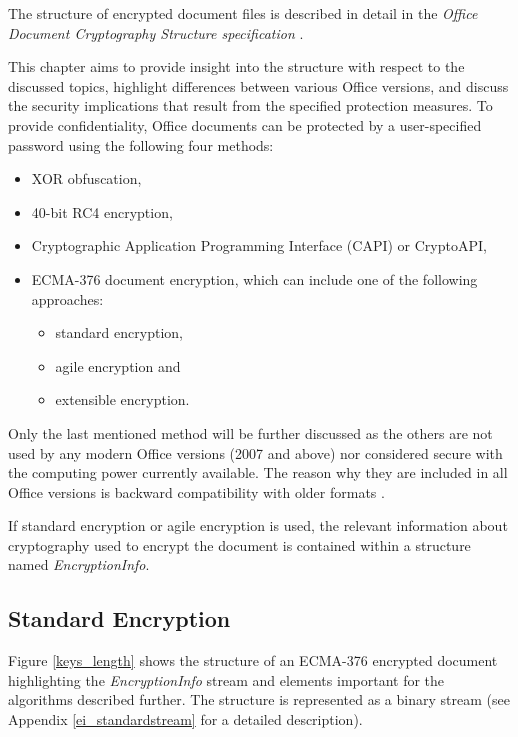 \documentclass[11pt,oneside]{fithesis2}
\begin{document}
The structure of encrypted document files is described in detail in the \textit{Office Document Cryptography Structure specification} \cite{msoffcrypto}.

This chapter aims to provide insight into the structure with respect to the discussed topics, highlight differences between various Office versions, and discuss the security implications that result from the specified protection measures.
To provide confidentiality, Office documents can be protected by a user-specified password using the following four methods:
\begin{itemize}
\setlength\itemsep{0.1em}
\item{XOR obfuscation,}
\item{40-bit RC4 encryption,}
\item{Cryptographic Application Programming Interface (CAPI) or CryptoAPI,}
\item{ECMA-376 document encryption, which can include one of the following approaches: }
	\begin{itemize}
	\setlength\itemsep{0.1em}
	\item{standard encryption,}
	\item{agile encryption and}
	\item{extensible encryption.}
	\end{itemize}
\end{itemize}

Only the last mentioned method will be further discussed as the others are not used by any modern Office versions (2007 and above) nor considered secure with the computing power currently available. The reason why they are included in all Office versions is backward compatibility with older formats \cite{msoffcrypto}.

If standard encryption or agile encryption is used, the relevant information about cryptography used to encrypt the document is contained within a structure named \textit{EncryptionInfo}.

\subsection{Standard Encryption}

Figure \ref{keys_length} shows the structure of an ECMA-376 encrypted document highlighting the \textit{EncryptionInfo} stream and elements important for the algorithms described further. The structure is represented as a binary stream (see Appendix \ref{ei_standardstream} for a detailed description).
\end{document}
